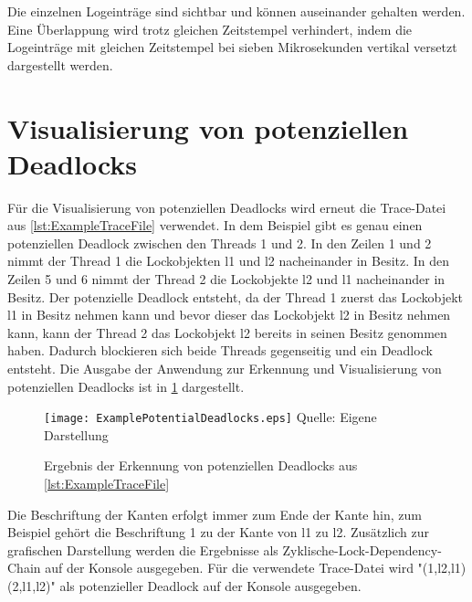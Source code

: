 Die einzelnen Logeinträge sind sichtbar und können auseinander gehalten werden.
Eine Überlappung wird trotz gleichen Zeitstempel verhindert, indem die
Logeinträge mit gleichen Zeitstempel bei sieben Mikrosekunden vertikal versetzt
dargestellt werden.

\section{Visualisierung von potenziellen Deadlocks}
\label{section:DeadlockVisualization}
Für die Visualisierung von potenziellen Deadlocks wird erneut die Trace-Datei
aus \cref{lst:ExampleTraceFile} verwendet. In dem Beispiel gibt es genau einen
potenziellen Deadlock zwischen den Threads \textrm{1} und \textrm{2}. In den
Zeilen 1 und 2 nimmt der Thread \textrm{1} die Lockobjekten \textrm{l1} und
\textrm{l2} nacheinander in Besitz. In den Zeilen 5 und 6 nimmt der Thread
\textrm{2} die Lockobjekte \textrm{l2} und \textrm{l1} nacheinander in Besitz.
Der potenzielle Deadlock entsteht, da der Thread \textrm{1} zuerst das
Lockobjekt \textrm{l1} in Besitz nehmen kann und bevor dieser das Lockobjekt
\textrm{l2} in Besitz nehmen kann, kann der Thread \textrm{2} das Lockobjekt
\textrm{l2} bereits in seinen Besitz genommen haben. Dadurch blockieren sich
beide Threads gegenseitig und ein Deadlock entsteht. Die Ausgabe der Anwendung
zur Erkennung und Visualisierung von potenziellen Deadlocks ist in
\cref{fig:DeadlockVisualization} dargestellt.
\begin{figure}[ht]
  \texttt{[image: ExamplePotentialDeadlocks.eps]}
  \footnotesize\sffamily Quelle: Eigene Darstellung
  \caption{Ergebnis der Erkennung von potenziellen Deadlocks aus \cref{lst:ExampleTraceFile}}
  \label{fig:DeadlockVisualization}
\end{figure}
Die Beschriftung der Kanten erfolgt immer zum Ende der Kante hin, zum Beispiel
gehört die Beschriftung \textrm{1} zu der Kante von \textrm{l1} zu \textrm{l2}.
Zusätzlich zur grafischen Darstellung werden die Ergebnisse als
Zyklische-Lock-Dependency-Chain auf der Konsole ausgegeben. Für die verwendete
Trace-Datei wird "(1,l2,{l1}) (2,l1,{l2})" als potenzieller Deadlock auf der
Konsole ausgegeben.